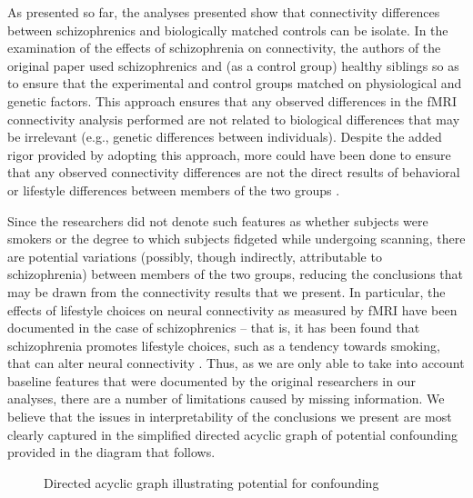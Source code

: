 \documentclass[11pt]{article}
\begin{document}
As presented so far, the analyses presented show that connectivity differences
between schizophrenics and biologically matched controls can be isolate. In the
examination of the effects of schizophrenia on connectivity, the authors of the
original paper used schizophrenics and (as a control group) healthy siblings so
as to ensure that the experimental and control groups matched on physiological
and genetic factors. This approach ensures that any observed differences in the
fMRI connectivity analysis performed are not related to biological differences
that may be irrelevant (e.g., genetic differences between individuals). Despite
the added rigor provided by adopting this approach, more could have been done to
ensure that any observed connectivity differences are not the direct results of
behavioral or lifestyle differences between members of the two groups \cite{gur2010functional}. 

Since the researchers did not denote such features as whether subjects were smokers or the
degree to which subjects fidgeted while undergoing scanning, there are potential
variations (possibly, though indirectly, attributable to schizophrenia) between
members of the two groups, reducing the conclusions that may be drawn from the
connectivity results that we present. In particular, the effects of lifestyle
choices on neural connectivity as measured by fMRI have been documented in the
case of schizophrenics -- that is, it has been found that schizophrenia promotes
lifestyle choices, such as a tendency towards smoking, that can alter neural
connectivity \cite{leyba2008smoking}. Thus, as we are only able to take into 
account baseline features that were documented by the original researchers in 
our analyses, there are a number of limitations caused by missing information. 
We believe that the issues in interpretability of the conclusions we present 
are most clearly captured in the simplified directed acyclic graph of potential 
confounding provided in the diagram that follows. \\[10pt]

\begin{figure}[H]
\centering
{}
\caption{Directed acyclic graph illustrating potential for confounding}
\end{figure}
\end{document}
